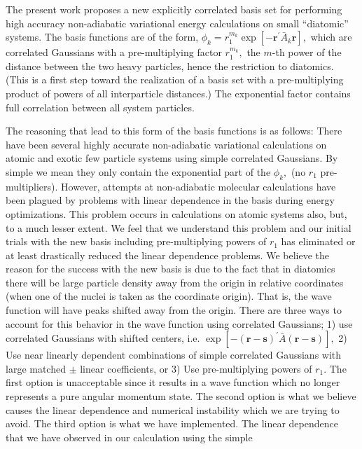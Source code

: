 \documentclass[12pt,doublespace]{article}
\begin{document}
The present work proposes a new explicitly correlated basis set for
performing high accuracy non-adiabatic variational energy calculations on
small ``diatomic'' systems. The basis functions are of the form,  $\phi
_{k}=r_{1}^{m_{k}}\exp [-\mathbf{r}^{\prime }\bar{A}_{k}\mathbf{r}],$ which
are correlated Gaussians with a pre-multiplying factor $r_{1}^{m_{k}},$ the $%
m$-th power of the distance between the two heavy particles, hence the
restriction to diatomics. (This is a first step toward the realization of a
basis set with a pre-multiplying product of powers of all interparticle
distances.) The exponential factor contains full correlation between all
system particles.

The reasoning that lead to this form of the basis functions is as follows:
There have been several highly accurate non-adiabatic variational
calculations on atomic and exotic few particle systems using simple
correlated Gaussians\cite
{Kinghorn93,Kinghorn95b,Kozlowski93b,Kinghorn96a,Varga96}. By simple we mean
they only contain the exponential part of the $\phi _{k},$ (no $r_{1}$
pre-multipliers). However, attempts at non-adiabatic molecular calculations
have been plagued by problems with linear dependence in the basis during
energy optimizations. This problem occurs in calculations on atomic systems
also, but, to a much lesser extent. We feel that we understand this problem
and our initial trials with the new basis including pre-multiplying powers
of $r_{1}$ has eliminated or at least drastically reduced the linear
dependence problems.  We believe the reason for the success with the new
basis is due to the fact that in diatomics there will be large particle
density away from the origin in relative coordinates (when one of the nuclei
is taken as the coordinate origin). That is, the wave function will have
peaks shifted away from the origin. There are three ways to account for this
behavior in the wave function using correlated Gaussians; 1) use correlated
Gaussians with shifted centers, i.e. $\exp [-\left( \mathbf{r-s}\right)
^{\prime }\bar{A}\left( \mathbf{r-s}\right) ],$ 2) Use near linearly
dependent combinations of simple correlated Gaussians with large matched $%
\pm $ linear coefficients, or 3) Use pre-multiplying powers of $r_{1}$. The
first option is unacceptable since it results in a wave function which no
longer represents a pure angular momentum state. The second option is what
we believe causes the linear dependence and numerical instability which we
are trying to avoid. The third option is what we have implemented. The
linear dependence that we have observed in our calculation using the simple
\end{document}

